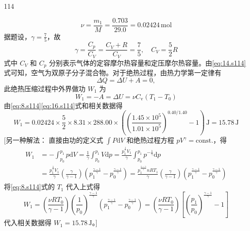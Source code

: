 \begin{solution}{114}
\begin{subsolution}
        \begin{equation}
            \nu = \frac{m_{1}}{M} = \frac{0.703}{29.0} = 0.02424 \,\mathrm{mol}
            \label{eq:13.s114}
        \end{equation}
        据题设，$\gamma=\frac{7}{5}$，故
        \begin{equation}
            \gamma = \frac{C_{p}}{C_{V}} = \frac{C_{V} + R}{C_{V}} = \frac{7}{5}, \quad C_{V} = \frac{5}{2} R
            \label{eq:14.s114}
        \end{equation}
        式中 $C_{V}$ 和 $C_{p}$ 分别表示气体的定容摩尔热容量和定压摩尔热容量。由\eqref{eq:14.s114}式可知，空气为双原子分子混合物。对于绝热过程，由热力学第一定律有
        \begin{equation}
            \Delta Q = \Delta U + A = 0,
            \label{eq:15.s114}
        \end{equation}
        此绝热压缩过程中外界做功 $W_{1}$ 为
        \begin{equation}
            W_{1} = - A = \Delta U = \nu C_{\mathrm{v}} (T_{1} - T_{0})
            \label{eq:16.s114}
        \end{equation}
        由\eqref{eq:8.s114}\eqref{eq:16.s114}式和相关数据得
        \begin{equation}
            W_{1} = 0.02424 \times \frac{5}{2} \times 8.31 \times 288.00 \times \left(\left(\frac{1.45 \times 10^{5}}{1.01 \times 10^{5}}\right)^{0.40/1.40} - 1\right) \,\mathrm{J} = 15.78 \,\mathrm{J}
            \label{eq:17.s114}
        \end{equation}
        [另一种解法：
        直接由功的定义式 $\int P\mathrm{d}V$ 和绝热过程方程 $pV^{\gamma} = \text{const.}$，得
        \begin{equation}
            \begin{aligned}
                W_{1} &= - \int_{p_{0}}^{p_{1}} p \mathrm{d} V = \frac{1}{\gamma} \int_{p_{0}}^{p_{1}} V \mathrm{d} p = \frac{p_{1}^{\frac{1}{\gamma}} V_{1}}{\gamma} \int_{p_{0}}^{p_{1}} p^{- \frac{1}{\gamma}} \mathrm{d} p \\
                &= \frac{p_{1}^{\frac{1}{\gamma}} V_{1}}{\gamma} \left(\frac{\gamma}{\gamma - 1}\right) \left(p_{1}^{\frac{\gamma - 1}{\gamma}} - p_{0}^{\frac{\gamma - 1}{\gamma}}\right) = \frac{p_{1}^{\frac{1 - \gamma}{\gamma}} n R T_{1}}{\gamma} \left(\frac{\gamma}{\gamma - 1}\right) \left(p_{1}^{\frac{\gamma - 1}{\gamma}} - p_{0}^{\frac{\gamma - 1}{\gamma}}\right)
            \end{aligned}
        \end{equation}
        将\eqref{eq:8.s114}式的 $T_{1}$ 代入上式得
        \begin{equation}
            W_{1} = \left(\frac{\nu R T_{0}}{\gamma - 1}\right) \left(\frac{1}{p_{0}}\right)^{\frac{\gamma - 1}{\gamma}} \left(p_{1}^{\frac{\gamma - 1}{\gamma}} - p_{0}^{\frac{\gamma - 1}{\gamma}}\right) = \left(\frac{\nu R T_{0}}{\gamma - 1}\right) \left[ \left(\frac{p_{1}}{p_{0}}\right)^{\frac{\gamma - 1}{\gamma}} - 1 \right]
            \label{eq:18.s114}
        \end{equation}
        代入相关数据得 $W_{1} = 15.78 \,\mathrm{J}$。]


\end{subsolution}
\end{solution}
